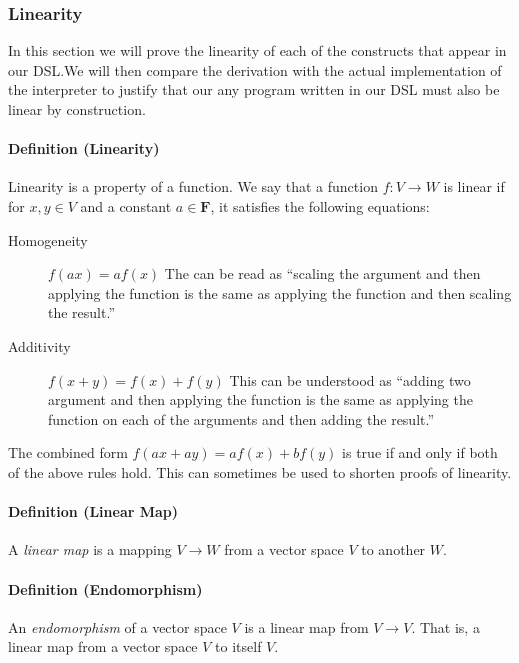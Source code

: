 \subsubsection{Linearity}

In this section we will prove the linearity of each of the constructs that
appear in our DSL.\@   We will then compare the derivation with the actual
implementation of the interpreter to justify that our any program written in
our DSL must also be linear by construction.

\paragraph{Definition (Linearity)} Linearity is a property of a function.  We
say that a function \(f \colon V \rightarrow W\) is linear if for \(x,y \in V\)
and a constant \(a \in \pmb{F}\), it satisfies the following equations:

\begin{description}

\item [Homogeneity] \( f(ax) = af(x) \) The can be read as \enquote{scaling the
  argument and then applying the function is the same as applying the function
    and then scaling the result.}

\item [Additivity] \(f(x+y) = f(x) + f(y) \) This can be understood as \enquote{adding
  two argument and then applying the function is the same as applying the
    function on each of the arguments and then adding the result.}

\end{description}

The combined form \(f(ax+ay) = af(x) + bf(y) \) is true if and only if both of
the above rules hold.  This can sometimes be used to shorten proofs of linearity.

\paragraph{Definition (Linear Map)}\label{linearmap}
A \textit{linear map} is a mapping \(V \rightarrow W\) from a vector space \(V\) to
another \(W\).

\paragraph{Definition (Endomorphism)}\label{endomorphism}
An \textit{endomorphism} of a vector space \(V\) is a linear map from \(V
\rightarrow V\).  That is, a linear map from a vector space \(V\) to itself \(V\).


